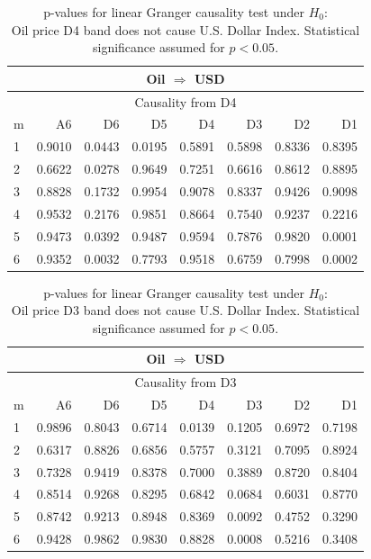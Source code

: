 %
%
\begin{table}[H]
\begin{center}
\begin{tabular}{l|r r r r r r r}
\hline\hline
\multicolumn{8}{c}{Oil $\Rightarrow$ USD}\\
\hline
\multicolumn{8}{c}{Causality from D4}\\
\hline\hline
m & A6 & D6 & D5 & D4 & D3 & D2 & D1 \\
\hline
1 & 0.9010 & \cellcolor{mygrey}0.0443 & \cellcolor{mygrey}0.0195 & 0.5891 & 0.5898 & 0.8336 & 0.8395 \\
2 & 0.6622 & \cellcolor{mygrey}0.0278 & 0.9649 & 0.7251 & 0.6616 & 0.8612 & 0.8895 \\
3 & 0.8828 & 0.1732 & 0.9954 & 0.9078 & 0.8337 & 0.9426 & 0.9098 \\
4 & 0.9532 & 0.2176 & 0.9851 & 0.8664 & 0.7540 & 0.9237 & 0.2216 \\
5 & 0.9473 & \cellcolor{mygrey}0.0392 & 0.9487 & 0.9594 & 0.7876 & 0.9820 & \cellcolor{mygreen}0.0001 \\
6 & 0.9352 & \cellcolor{mygrey}0.0032 & 0.7793 & 0.9518 & 0.6759 & 0.7998 & \cellcolor{mygreen}0.0002 \\
\hline\hline
\end{tabular}
\caption{p-values for linear Granger causality test under $H_0$:\\
Oil price D4 band does not cause U.S. Dollar Index. Statistical significance assumed for $p<0.05$.}
\end{center}
\end{table}

%
%
\begin{table}[H]
\begin{center}
\begin{tabular}{l|r r r r r r r}
\hline\hline
\multicolumn{8}{c}{Oil $\Rightarrow$ USD}\\
\hline
\multicolumn{8}{c}{Causality from D3}\\
\hline\hline
m & A6 & D6 & D5 & D4 & D3 & D2 & D1 \\
\hline
1 & 0.9896 & 0.8043 & 0.6714 & \cellcolor{mygrey}0.0139 & 0.1205 & 0.6972 & 0.7198 \\
2 & 0.6317 & 0.8826 & 0.6856 & 0.5757 & 0.3121 & 0.7095 & 0.8924 \\
3 & 0.7328 & 0.9419 & 0.8378 & 0.7000 & 0.3889 & 0.8720 & 0.8404 \\
4 & 0.8514 & 0.9268 & 0.8295 & 0.6842 & 0.0684 & 0.6031 & 0.8770 \\
5 & 0.8742 & 0.9213 & 0.8948 & 0.8369 & \cellcolor{mygrey}0.0092 & 0.4752 & 0.3290 \\
6 & 0.9428 & 0.9862 & 0.9830 & 0.8828 & \cellcolor{mygrey}0.0008 & 0.5216 & 0.3408 \\
\hline\hline
\end{tabular}
\caption{p-values for linear Granger causality test under $H_0$:\\
Oil price D3 band does not cause U.S. Dollar Index. Statistical significance assumed for $p<0.05$.}
\end{center}
\end{table}

